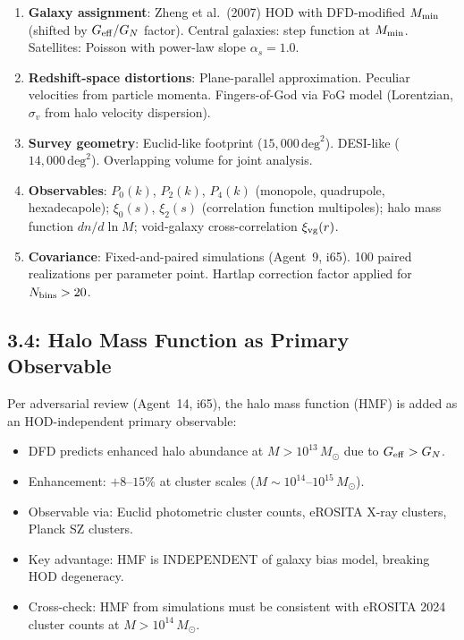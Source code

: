 \documentclass[11pt,a4paper]{article}
\begin{document}
\begin{enumerate}
\item \textbf{Galaxy assignment}: Zheng et al.\ (2007) HOD with DFD-modified $M_{\rm min}$ (shifted by $G_{\rm eff}/G_N$ factor). Central galaxies: step function at $M_{\rm min}$. Satellites: Poisson with power-law slope $\alpha_s = 1.0$.

\item \textbf{Redshift-space distortions}: Plane-parallel approximation. Peculiar velocities from particle momenta. Fingers-of-God via FoG model (Lorentzian, $\sigma_v$ from halo velocity dispersion).

\item \textbf{Survey geometry}: Euclid-like footprint ($15{,}000\,\text{deg}^2$). DESI-like ($14{,}000\,\text{deg}^2$). Overlapping volume for joint analysis.

\item \textbf{Observables}: $P_0(k)$, $P_2(k)$, $P_4(k)$ (monopole, quadrupole, hexadecapole); $\xi_0(s)$, $\xi_2(s)$ (correlation function multipoles); halo mass function $dn/d\ln M$; void-galaxy cross-correlation $\xi_{\rm vg}(r)$.

\item \textbf{Covariance}: Fixed-and-paired simulations (Agent~9, i65). 100 paired realizations per parameter point. Hartlap correction factor applied for $N_{\rm bins} > 20$.
\end{enumerate}

\subsection{3.4: Halo Mass Function as Primary Observable}

Per adversarial review (Agent~14, i65), the halo mass function (HMF) is added as an HOD-independent primary observable:

\begin{itemize}
\item DFD predicts enhanced halo abundance at $M > 10^{13}\,M_\odot$ due to $G_{\rm eff} > G_N$.
\item Enhancement: $+8$--$15\%$ at cluster scales ($M \sim 10^{14}$--$10^{15}\,M_\odot$).
\item Observable via: Euclid photometric cluster counts, eROSITA X-ray clusters, Planck SZ clusters.
\item Key advantage: HMF is INDEPENDENT of galaxy bias model, breaking HOD degeneracy.
\item Cross-check: HMF from simulations must be consistent with eROSITA 2024 cluster counts at $M > 10^{14}\,M_\odot$.
\end{itemize}
\end{document}
